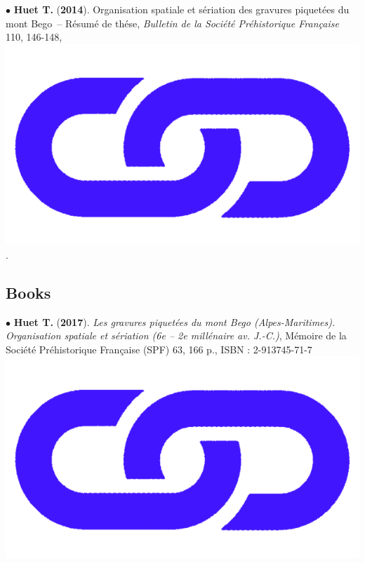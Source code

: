 \documentclass{article}
\newcommand{\fr}[1]{} %
\newcommand{\en}[1]{#1}   %
\begin{document}
\smallbreak
$\bullet$ \textbf{Huet T.} (\textbf{2014}). Organisation spatiale et s\'{e}riation des gravures piquet\'{e}es du mont Bego~-- R\'{e}sum\'{e} de th\'{e}se, \textit{Bulletin de la Soci\'{e}t\'{e} Pr\'{e}historique Fran\c{c}aise} 110, 146-148, \href{https://www.persee.fr/doc/bspf_0249-7638_2013_num_110_1_14242}{\includegraphics[scale=0.02]{link_darkblue.png}}.

\subsection*{\fr{Ouvrages}\en{Books}}

\smallbreak
$\bullet$ \textbf{Huet T.} (\textbf{2017}). \textit{Les gravures piquet\'{e}es du mont Bego (Alpes-Maritimes). Organisation spatiale et s\'{e}riation (6e -- 2e mill\'{e}naire av. J.-C.)}, M\'{e}moire de la Soci\'{e}t\'{e} Pr\'{e}historique Fran\c{c}aise (SPF) 63, 166 p., ISBN : 2-913745-71-7 \href{http://www.prehistoire.org/shop_515-40342-0-0/m63-2017-les-gravures-piquetees-du-mont-bego-alpes-maritimes-organisation-spatiale-et-seriation-vie-iie-millenaire-av.-j.-c.-t.-huet.html}{\includegraphics[scale=0.02]{link_darkblue.png}}
\end{document}
